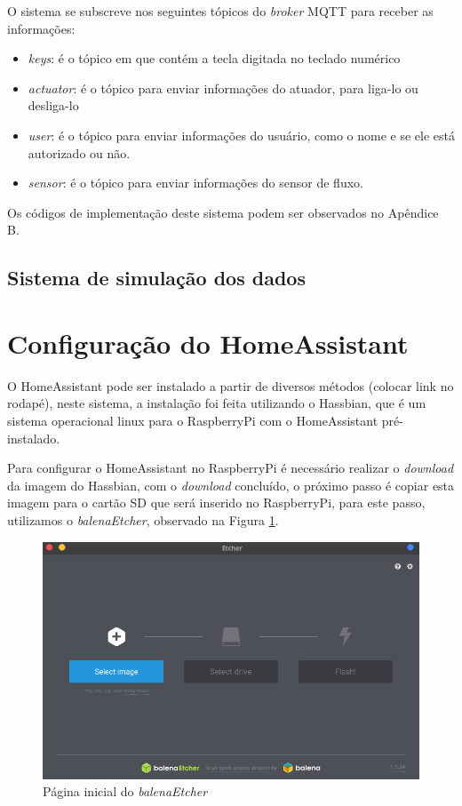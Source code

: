 O sistema se subscreve nos seguintes tópicos do \textit{broker} MQTT para receber as informações:

\begin{itemize}
	\item \textit{keys}: é o tópico em que contém a tecla digitada no teclado numérico
	\item \textit{actuator}: é o tópico para enviar informações do atuador, para liga-lo ou desliga-lo
	\item \textit{user}: é o tópico para enviar informações do usuário, como o nome e se ele está autorizado ou não.
	\item \textit{sensor}: é o tópico para enviar informações do sensor de fluxo.
\end{itemize}

Os códigos de implementação deste sistema podem ser observados no Apêndice B.

\subsection{Sistema de simulação dos dados}



\section{Configuração do HomeAssistant}

O HomeAssistant pode ser instalado a partir de diversos métodos (colocar link no rodapé), neste sistema, a instalação foi feita utilizando o Hassbian, que é um sistema operacional linux para o RaspberryPi com o HomeAssistant pré-instalado.

Para configurar o HomeAssistant no RaspberryPi é necessário realizar o \textit{download} da imagem do Hassbian, com o \textit{download} concluído, o próximo passo é copiar esta imagem para o cartão SD que será inserido no RaspberryPi, para este passo, utilizamos o \textit{balenaEtcher}, observado na Figura \ref{fig:etcher}.

\begin{figure}[htbp]
	\centering
	\includegraphics[width=0.5\linewidth]{figuras/etcher.png}
	\caption{Página inicial do \textit{balenaEtcher}}
	\label{fig:etcher}
\end{figure}


